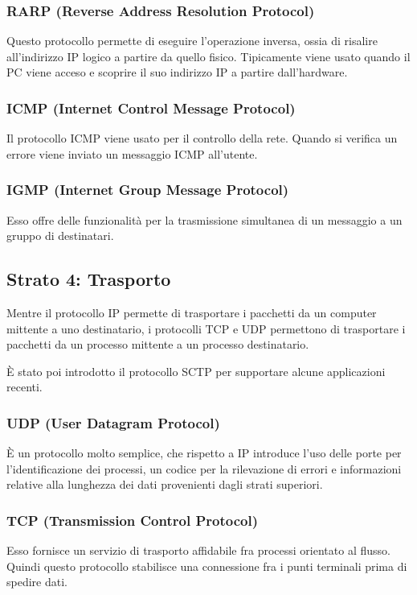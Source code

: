         \subsubsection{RARP (Reverse Address Resolution Protocol)}
            Questo protocollo permette di eseguire l'operazione inversa, ossia di risalire all'indirizzo IP logico a partire da quello fisico. Tipicamente viene usato quando il PC viene acceso e scoprire il suo indirizzo IP a partire dall'hardware.
            
        \subsubsection{ICMP (Internet Control Message Protocol)}
            Il protocollo ICMP viene usato per il controllo della rete. Quando si verifica un errore viene inviato un messaggio ICMP all'utente.
            
        \subsubsection{IGMP (Internet Group Message Protocol)}
            Esso offre delle funzionalità per la trasmissione simultanea di un messaggio a un gruppo di destinatari.
            
    \subsection{Strato 4: Trasporto}
        Mentre il protocollo IP permette di trasportare i pacchetti da un computer mittente a uno destinatario, i protocolli TCP e UDP permettono di trasportare i pacchetti da un processo mittente a un processo destinatario.
        
        È stato poi introdotto il protocollo SCTP per supportare alcune applicazioni recenti.
        
        \subsubsection{UDP (User Datagram Protocol)}
            È un protocollo molto semplice, che rispetto a IP introduce l'uso delle porte per l'identificazione dei processi, un codice per la rilevazione di errori e informazioni relative alla lunghezza dei dati provenienti dagli strati superiori.
            
        \subsubsection{TCP (Transmission Control Protocol)}
            Esso fornisce un servizio di trasporto affidabile fra processi orientato al flusso. Quindi questo protocollo stabilisce una connessione fra i punti terminali prima di spedire dati.
            
